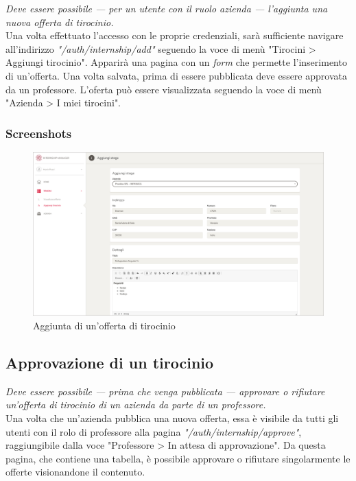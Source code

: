 \textit{Deve essere possibile --- per un utente con il ruolo azienda --- l'aggiunta una nuova offerta di tirocinio.} \\

\noindent
Una volta effettuato l'accesso con le proprie credenziali, sarà sufficiente navigare all'indirizzo \textit{"/auth/internship/add"} seguendo la voce di menù "Tirocini > Aggiungi tirocinio". Apparirà una pagina con un \textit{form} che permette l'inserimento di un'offerta. Una volta salvata, prima di essere pubblicata deve essere approvata da un professore. L'oferta può essere visualizzata seguendo la voce di menù "Azienda > I miei tirocini".

\subsubsection{Screenshots}
\begin{figure}[H]
	\centering
		\includegraphics[width=1\textwidth]{Figs/screenshots/addinternship}     
	\caption[Screenshot: aggiunta di un'offerta di tirocinio]{Aggiunta di un'offerta di tirocinio}
	\label{fig:screenshot:2}
\end{figure}

\pagebreak
\subsection{Approvazione di un tirocinio}

\textit{Deve essere possibile --- prima che venga pubblicata --- approvare o rifiutare un'offerta di tirocinio di un azienda da parte di un professore.} \\

\noindent
Una volta che un'azienda pubblica una nuova offerta, essa è visibile da tutti gli utenti con il rolo di professore alla pagina \textit{"/auth/internship/approve"}, raggiungibile dalla voce "Professore > In attesa di approvazione". Da questa pagina, che contiene una tabella, è possibile approvare o rifiutare singolarmente le offerte visionandone il contenuto.

